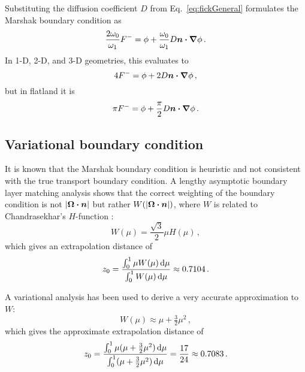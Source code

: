 Substituting the diffusion coefficient $D$ from Eq.~\eqref{eq:fickGeneral}
formulates the Marshak boundary condition as
\begin{equation*}
\frac{2\omega_0}{\omega_1} F^{-}
= \phi + \frac{\omega_0}{\omega_1} D \bm{n} \bm{\cdot} \bm{\nabla} \phi\,.
\end{equation*}
In 1-D, 2-D, and 3-D geometries, this evaluates to
\begin{equation*}
4 F^{-}
= \phi + 2 D \bm{n} \bm{\cdot} \bm{\nabla} \phi\,,
\end{equation*}
but in flatland it is
\begin{equation}\label{eq:flatlandDiffusionMarshak}
\pi F^{-}
= \phi + \frac{\pi}{2} D \bm{n} \bm{\cdot} \bm{\nabla} \phi\,.
\end{equation}

\subsection{Variational boundary condition} \label{sec:varBndy}
It is known that the Marshak boundary condition is heuristic and not consistent with the
true transport boundary condition. A lengthy asymptotic boundary layer
matching analysis \cite{Hab1975} shows that the correct weighting of the
boundary condition is not $\left| \bm{\Omega}\bm{\cdot}\bm{n} \right|$ but rather
$W(\left| \bm{\Omega}\bm{\cdot}\bm{n} \right|)$, where $W$ is related to Chandrasekhar's
$H$-function \cite{Cha1960}:
\begin{equation*}
  W(\mu) = \frac{\sqrt{3}}{2} \mu H(\mu) \,,
\end{equation*}
which gives an extrapolation distance of
\begin{align*}
  z_0 = \frac{\int_{0}^{1} \mu W(\mu) \mathop{}\!\mathrm{d} \mu}{\int_{0}^{1} W(\mu) \mathop{}\!\mathrm{d}
  \mu} \approx 0.7104\,.
\end{align*}

A variational analysis \cite{Mal1991} has been used to
derive a very accurate approximation to $W$:
\begin{equation*}
W(\mu) \approx \mu + \tfrac{3}{2} \mu^2 \,,
\end{equation*}
which gives the approximate extrapolation distance of
\begin{equation*}
  z_0 = \frac{\int_{0}^{1} \mu (\mu + \tfrac{3}{2} \mu^2 ) \mathop{}\!\mathrm{d}
  \mu}{\int_{0}^{1} (\mu + \tfrac{3}{2} \mu^2 ) \mathop{}\!\mathrm{d} \mu} 
  = \frac{17}{24} \approx 0.7083 \,.
\end{equation*}


